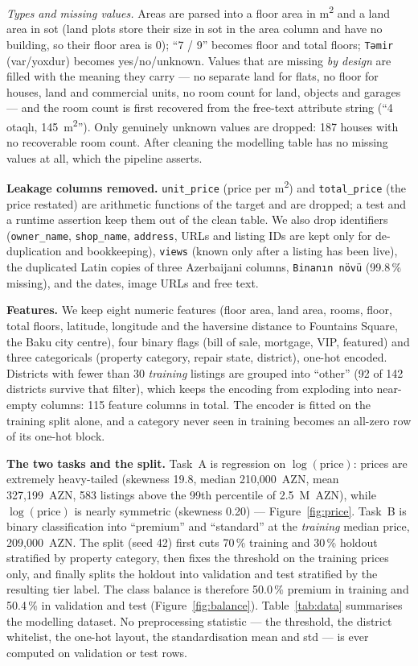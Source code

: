 \documentclass[10pt,twocolumn,a4paper]{article}
\begin{document}
\emph{Types and missing values.} Areas are parsed into a floor area in
m\textsuperscript{2} and a land area in sot (land plots store their size in
sot in the area column and have no building, so their floor area is 0);
``7 / 9'' becomes floor and total floors; \texttt{Təmir}
(var/yoxdur) becomes yes/no/unknown. Values that are missing \emph{by design}
are filled with the meaning they carry --- no separate land for flats, no
floor for houses, land and commercial units, no room count for land, objects
and garages --- and the room count is first recovered from the free-text
attribute string (``4 otaqlı, 145~m\textsuperscript{2}''). Only genuinely
unknown values are dropped: 187 houses with no recoverable room count. After
cleaning the modelling table has no missing values at all, which the pipeline
asserts.

\textbf{Leakage columns removed.} \texttt{unit\_price} (price per
m\textsuperscript{2}) and \texttt{total\_price} (the price restated) are
arithmetic functions of the target and are dropped; a test and a runtime
assertion keep them out of the clean table. We also drop identifiers
(\texttt{owner\_name}, \texttt{shop\_name}, \texttt{address}, URLs and listing
IDs are kept only for de-duplication and bookkeeping), \texttt{views} (known
only after a listing has been live), the duplicated Latin copies of three
Azerbaijani columns, \texttt{Binanın növü} (99.8\,\% missing), and the
dates, image URLs and free text.

\textbf{Features.} We keep eight numeric features (floor area, land area,
rooms, floor, total floors, latitude, longitude and the haversine distance to
Fountains Square, the Baku city centre), four binary flags (bill of sale,
mortgage, VIP, featured) and three categoricals (property category, repair
state, district), one-hot encoded. Districts with fewer than 30 \emph{training}
listings are grouped into ``other'' (92 of 142 districts survive that filter),
which keeps the encoding from exploding into near-empty columns: 115 feature
columns in total. The encoder is fitted on the training split alone, and a
category never seen in training becomes an all-zero row of its one-hot block.

\textbf{The two tasks and the split.} Task~A is regression on
$\log(\text{price})$: prices are extremely heavy-tailed (skewness 19.8, median
210{,}000~AZN, mean 327{,}199~AZN, 583 listings above the 99th percentile of
2.5~M~AZN), while $\log(\text{price})$ is nearly symmetric (skewness 0.20) ---
Figure~\ref{fig:price}. Task~B is binary classification into ``premium'' and
``standard'' at the \emph{training} median price, 209{,}000~AZN. The split
(seed 42) first cuts 70\,\% training and 30\,\% holdout stratified by property
category, then fixes the threshold on the training prices only, and finally
splits the holdout into validation and test stratified by the resulting tier
label. The class balance is therefore 50.0\,\% premium in training and
50.4\,\% in validation and test (Figure~\ref{fig:balance}). Table~\ref{tab:data}
summarises the modelling dataset. No
preprocessing statistic --- the threshold, the district whitelist, the one-hot
layout, the standardisation mean and std --- is ever computed on validation or
test rows.
\end{document}
